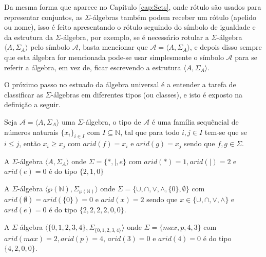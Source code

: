 \begin{nota}
  Da mesma forma que aparece no Capítulo \ref{cap:Sets}, onde rótulo são usados para representar conjuntos, as $\Sigma$-álgebras também podem receber um rótulo (apelido ou nome), isso é feito apresentando o rótulo seguindo do símbolo de igualdade e da estrutura da $\Sigma$-álgebra, por exemplo, se é necessário rotular a $\Sigma$-álgebra $\langle A, \Sigma_A \rangle$ pelo símbolo $\mathcal{A}$, basta mencionar que $\mathcal{A} = \langle A, \Sigma_A \rangle$, e depois disso sempre que esta álgebra for mencionada pode-se usar simplesmente o símbolo $\mathcal{A}$ para se referir a álgebra, em vez de, ficar escrevendo a estrutura $\langle A, \Sigma_A \rangle$.
\end{nota}

O próximo passo no estuado da álgebra universal é a entender a tarefa de classificar as $\Sigma$-álgebras em diferentes tipos (ou classes), e isto é exposto na definição a seguir.

\begin{definicao}
  Seja $\mathcal{A} = \langle A, \Sigma_A \rangle$ uma $\Sigma$-álgebra, o tipo de $\mathcal{A}$ é uma família sequêncial de números naturais $\{x_i\}_{i \in I}$ com $I \subseteq \mathbb{N}$, tal que para todo $i, j \in I$ tem-se que se $i \leq j$, então $x_i \geq x_j$ com $arid(f) = x_i$ e $arid(g) = x_j$ sendo que $f, g 
  \in \Sigma$.
\end{definicao}

\begin{exemplo}\label{exe:TipoSigmaAlgebra1}
  A $\Sigma$-álgebra $\langle A, \Sigma_A \rangle$ onde $\Sigma = \{ *, \mid, e \}$ com $arid(*) = 1, arid(\mid) = 2$ e $arid(e) = 0$ é do tipo $\{2, 1, 0\}$
\end{exemplo}

\begin{exemplo}\label{exe:TipoSigmaAlgebra2}
  A $\Sigma$-álgebra $\langle \wp(\mathbb{N}), \Sigma_{\wp(\mathbb{N})} \rangle$ onde $\Sigma = \{ \cup, \cap, \vee, \wedge, \{0\}, \emptyset \}$ com $arid(\emptyset) = arid(\{0\}) = 0$ e $arid(x) = 2$ sendo que $x \in \{\cup, \cap, \vee, \wedge\}$ e $arid(e) = 0$ é do tipo $\{2, 2, 2, 2, 0, 0\}$.
\end{exemplo}

\begin{exemplo}\label{exe:TipoSigmaAlgebra3}
  A $\Sigma$-álgebra $\langle \{0, 1, 2, 3, 4\}, \Sigma_{\{0, 1, 2, 3, 4\}} \rangle$ onde $\Sigma = \{ max, p, 4, 3 \}$ com $arid(max) = 2, arid(p) = 4$, $arid(3) = 0$ e $arid(4) = 0$ é do tipo $\{4, 2, 0, 0\}$.
\end{exemplo}